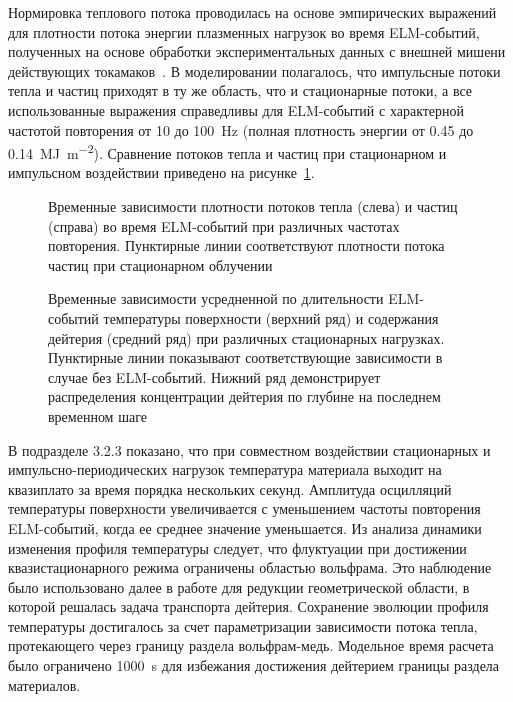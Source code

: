 Нормировка теплового потока проводилась на основе эмпирических выражений для плотности потока энергии плазменных нагрузок во время ELM-событий, полученных на основе обработки экспериментальных данных с внешней мишени действующих токамаков~\cite{Eich2017,VandenKerkhof2021}. В моделировании полагалось, что импульсные потоки тепла и частиц приходят в ту же область, что и стационарные потоки, а все использованные выражения справедливы для ELM-событий с характерной частотой повторения от 10 до \SI{100}{\hertz} (полная плотность энергии от \num{0.45} до \SI{0.14}{\mega\joule\per\meter\squared}). Сравнение потоков тепла и частиц при стационарном и импульсном воздействии приведено на рисунке~\cref{fig:ELM_fluxes}. 

\begin{figure}[ht]
	\caption{Временные зависимости плотности потоков тепла (слева) и частиц (справа) во время ELM-событий при различных частотах повторения. Пунктирные линии соответствуют плотности потока частиц при стационарном облучении}\label{fig:ELM_fluxes}
\end{figure}

\begin{figure}[ht]
	\caption{Временные зависимости усредненной по длительности ELM-событий температуры поверхности (верхний ряд) и содержания дейтерия (средний ряд) при различных стационарных нагрузках. Пунктирные линии показывают соответствующие зависимости в случае без ELM-событий. Нижний ряд демонстрирует распределения концентрации дейтерия по глубине на последнем временном шаге}\label{fig:ELMs_frequency}
\end{figure}

В подразделе 3.2.3 показано, что при совместном воздействии стационарных и импульсно-периодических нагрузок температура материала выходит на квазиплато за время порядка нескольких секунд. Амплитуда осцилляций температуры поверхности увеличивается с уменьшением частоты повторения ELM-событий, когда ее среднее значение уменьшается. Из анализа динамики изменения профиля температуры следует, что флуктуации при достижении квазистационарного режима ограничены областью вольфрама. Это наблюдение было использовано далее в работе для редукции геометрической области, в которой решалась задача транспорта дейтерия. Сохранение эволюции профиля температуры достигалось за счет параметризации зависимости потока тепла, протекающего через границу раздела вольфрам-медь. Модельное время расчета было ограничено \SI{1000}{\second} для избежания достижения дейтерием границы раздела материалов.

